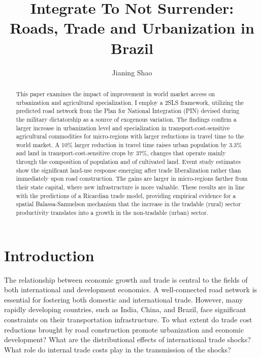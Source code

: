 \documentclass[11pt]{article}
\title{\textbf{Integrate To Not Surrender: Roads, Trade and Urbanization in Brazil}}
\author{Jianing Shao \footnotemark}
\begin{document}
\onehalfspacing
\renewcommand{\thefootnote}{\fnsymbol{footnote}}
\maketitle
\begin{abstract}
This paper examines the impact of improvement in world market access on urbanization and agricultural specialization. I employ a 2SLS framework, utilizing the predicted road network from the Plan for National Integration (PIN) devised during the military dictatorship as a source of exogenous variation. The findings confirm a larger increase in urbanization level and specialization in transport-cost-sensitive agricultural commodities for micro-regions with larger reductions in travel time to the world market. A 10\% larger reduction in travel time raises urban population by 3.3\% and land in transport-cost-sensitive crops by 37\%, changes that operate mainly through the composition of population and of cultivated land. Event study estimates show the significant land-use response emerging after trade liberalization rather than immediately upon road construction. The gains are larger in micro-regions farther from their state capital, where new infrastructure is more valuable. These results are in line with the predictions of a Ricardian trade model, providing empirical evidence for a spatial Balassa-Samuelson mechanism that the increase in the tradable (rural) sector productivity translates into a growth in the non-tradable (urban) sector.
\end{abstract}


\newpage

\renewcommand{\thefootnote}{\arabic{footnote}}


\section{Introduction}

The relationship between economic growth and trade is central to the fields of both international and development economics. A well-connected road network is essential for fostering both domestic and international trade. However, many rapidly developing countries, such as India, China, and Brazil, face significant constraints on their transportation infrastructure. To what extent do trade cost reductions brought by road construction promote urbanization and economic development? What are the distributional effects of international trade shocks? What role do internal trade costs play in the transmission of the shocks?
\end{document}
